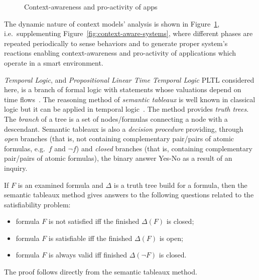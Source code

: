\documentclass[runningheads,a4paper]{llncs}
\begin{document}
\begin{figure}[htb]
\centering
{}
\caption{Context-awareness and pro-activity of apps}
\label{fig:app}
\end{figure}
The dynamic nature of context models' analysis is shown in Figure~\ref{fig:app},
i.e.\ supplementing Figure~\ref{fig:context-aware-systems},
where different phases are repeated periodically to sense behaviors and
to generate proper system's reactions
enabling context-awareness and pro-activity of applications which operate
in a smart environment.

\emph{Temporal Logic},
and \emph{Propositional Linear Time Temporal Logic} PLTL considered here,
is a branch of formal logic with statements whose valuations depend on
time flows~\cite{Wolter-Wooldridge-2011}.
The reasoning method of \emph{semantic tableaux}
is well known in classical logic but it can be applied in temporal logic~\cite{Hahnle-2001,Klimek-2014-AMCS}.
The method provides \emph{truth trees}.
The \emph{branch} of a tree is a set of nodes/formulas connecting a node with a descendant.
Semantic tableaux is also a \emph{decision procedure} providing,
through \emph{open} branches
(that is, not containing complementary pair/pairs of atomic formulas, e.g.\ $f$ and $\neg f$) and
\emph{closed} branches
(that is, containing complementary pair/pairs of atomic formulas),
the binary answer Yes-No as a result of an inquiry.
\begin{corollary}
\label{th:decision-procedures}
If $F$ is an examined formula and $\Delta$ is a truth tree build for a formula,
then the semantic tableaux method gives answers to the following questions related to the satisfiability problem:
\begin{itemize}
\item formula $F$ is not satisfied iff the finished $\Delta(F)$ is closed;
\item formula $F$ is satisfiable iff the finished $\Delta(F)$ is open;
\item formula $F$ is always  valid iff finished $\Delta(\neg F)$ is closed.
\end{itemize}
\end{corollary}
The proof follows directly from the semantic tableaux method.
\end{document}
